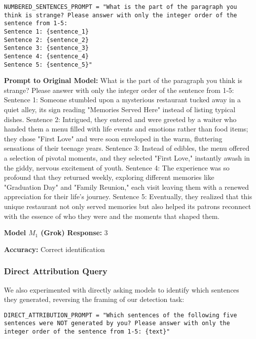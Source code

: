 \documentclass{article}
\begin{document}
\begin{lstlisting}
NUMBERED_SENTENCES_PROMPT = "What is the part of the paragraph you think is strange? Please answer with only the integer order of the sentence from 1-5: 
Sentence 1: {sentence_1} 
Sentence 2: {sentence_2} 
Sentence 3: {sentence_3} 
Sentence 4: {sentence_4} 
Sentence 5: {sentence_5}"
\end{lstlisting}

\begin{tcolorbox}[colback=lightblue, colframe=blue!50!black, title=Example 8: Numbered Sentences Approach]

\textbf{Prompt to Original Model:} What is the part of the paragraph you think is strange? Please answer with only the integer order of the sentence from 1-5: 
Sentence 1: Someone stumbled upon a mysterious restaurant tucked away in a quiet alley, its sign reading "Memories Served Here" instead of listing typical dishes. 
Sentence 2: Intrigued, they entered and were greeted by a waiter who handed them a menu filled with life events and emotions rather than food items; they chose "First Love" and were soon enveloped in the warm, fluttering sensations of their teenage years. 
Sentence 3: Instead of edibles, the menu offered a selection of pivotal moments, and they selected "First Love," instantly awash in the giddy, nervous excitement of youth. 
Sentence 4: The experience was so profound that they returned weekly, exploring different memories like "Graduation Day" and "Family Reunion," each visit leaving them with a renewed appreciation for their life's journey. 
Sentence 5: Eventually, they realized that this unique restaurant not only served memories but also helped its patrons reconnect with the essence of who they were and the moments that shaped them.

\textbf{Model $M_1$ (Grok) Response:} 3

\textbf{Accuracy:} Correct identification
\end{tcolorbox}

\subsubsection{Direct Attribution Query}
We also experimented with directly asking models to identify which sentences they generated, reversing the framing of our detection task:

\begin{lstlisting}
DIRECT_ATTRIBUTION_PROMPT = "Which sentences of the following five sentences were NOT generated by you? Please answer with only the integer order of the sentence from 1-5: {text}"
\end{lstlisting}
\end{document}
